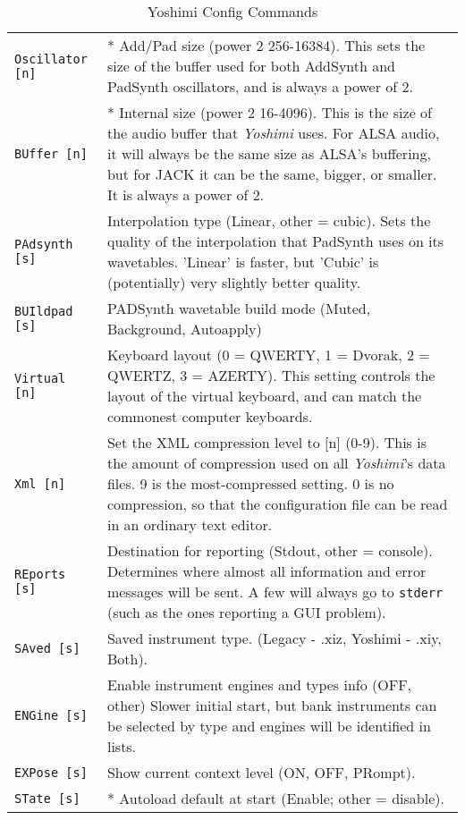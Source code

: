 \begin{center}
\begin{longtable}{p{4cm} p{10cm}}
\caption[Yoshimi Config Commands]{Yoshimi Config Commands} \\

\texttt{Oscillator [n]} &
   * Add/Pad size (power 2 256-16384).
   This sets the size of the buffer used for both AddSynth and PadSynth
   oscillators, and is always a power of 2.  \\
\texttt{BUffer [n]} &
   * Internal size (power 2 16-4096).
   This is the size of the audio buffer that \textsl{Yoshimi} uses.  For ALSA
   audio, it will always be the same size as ALSA's buffering, but for JACK
   it can be the same, bigger, or smaller. It is always a power of 2. \\
\texttt{PAdsynth [s]} &
   Interpolation type (Linear, other = cubic).
   Sets the quality of the interpolation that PadSynth uses on its
   wavetables.
   'Linear' is faster, but 'Cubic' is (potentially) very slightly better
   quality. \\
\texttt{BUIldpad [s]} &
   PADSynth wavetable build mode (Muted, Background, Autoapply)\\
\texttt{Virtual [n]} &
   Keyboard layout (0 = QWERTY, 1 = Dvorak, 2 = QWERTZ, 3 = AZERTY).
   This setting controls the layout of the virtual keyboard, and can match
   the commonest computer keyboards. \\
\texttt{Xml [n]} &
   Set the XML compression level to [n] (0-9).
   This is the amount of compression used on all
   \textsl{Yoshimi}'s data files. 9 is the most-compressed setting.
   0 is no compression, so that the configuration file
   can be read in an ordinary text editor. \\
\texttt{REports [s]} &
   Destination for reporting (Stdout, other = console).
   Determines where almost all information and error messages will be sent.
   A few will always go to \texttt{stderr} (such as the ones reporting a GUI
   problem). \\
\texttt{SAved [s]} &
   Saved instrument type. (Legacy - .xiz, Yoshimi - .xiy, Both).\\
\texttt{ENGine [s]} &
   Enable instrument engines and types info (OFF, {other})
   Slower initial start, but bank instruments can be selected by type and
   engines will be identified in lists.\\
\texttt{EXPose [s]} &
   Show current context level (ON, OFF, PRompt).\\
\texttt{STate [s]} &
   * Autoload default at start (Enable; other = disable).

\end{longtable}
\end{center}

